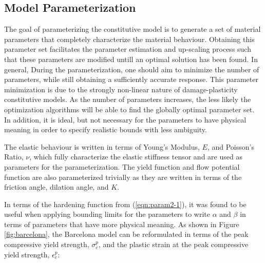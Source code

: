 \subsection{Model Parameterization}

The goal of parameterizing the constitutive model is to generate a set of material parameters that completely characterize the material behaviour. Obtaining this parameter set facilitates the parameter estimation and up-scaling process such that these parameters are modified untill an optimal solution has been found. In general, During the parameterization, one should aim to minimize the number of parameters, while still obtaining a sufficiently accurate response. This parameter minimization is due to the strongly non-linear nature of damage-plasticity constitutive models. As the number of parameters increases, the less likely the optimization algorithms will be able to find the globally optimal parameter set. In addition, it is ideal, but not necessary for the parameters to have physical meaning in order to specify realistic bounds with less ambiguity.

The elastic behaviour is written in terms of Young's Modulus, $E$, and Poisson's Ratio, $\nu$, which fully characterize the elastic stiffness tensor and are used as parameters for the parameterization. The yield function and flow potential function are also parameterized trivially as they are written in terms of the friction angle, dilation angle, and $K$.

In terms of the hardening function from (\ref{eqn:param2-1}), it was found to be useful when applying bounding limits for the parameters to write $\alpha$ and $\beta$ in terms of parameters that have more physical meaning.  As shown in Figure \ref{fig:barcelona}, the Barcelona model can be reformulated in terms of the peak compressive yield strength, $\sigma_{c}^{p}$, and the plastic strain at the peak compressive yield strength, $\epsilon_c^{p}$:
